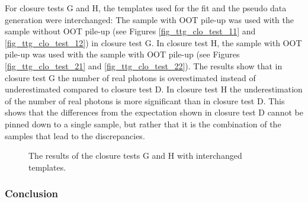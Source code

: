 For closure tests G and H, the templates used for the fit and the pseudo data generation were interchanged: The \ttgamma sample with OOT pile-up was used with the \ttbar sample without OOT pile-up (see Figures \ref{fig_ttg_clo_test_11} and \ref{fig_ttg_clo_test_12}) in closure test G. In closure test H, the \ttgamma sample with OOT pile-up was used with the \ttbar sample with OOT pile-up (see Figures \ref{fig_ttg_clo_test_21} and \ref{fig_ttg_clo_test_22}). The results show that in closure test G the number of real photons is overestimated instead of underestimated compared to closure test D. In closure test H the underestimation of the number of real photons is more significant than in closure test D. This shows that the differences from the expectation shown in closure test D cannot be pinned down to a single sample, but rather that it is the combination of the samples that lead to the discrepancies.

\begin{figure}[ht]
  \caption{The results of the closure tests G and H with interchanged templates.}
  \label{fig_ttg_clo_test}
\end{figure}

\FloatBarrier
\subsubsection{Conclusion}

